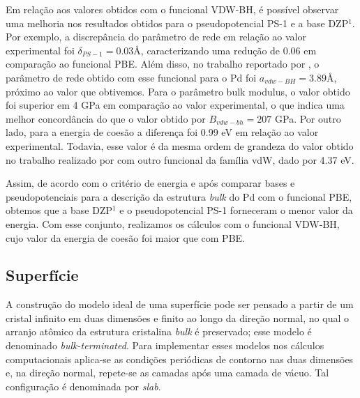 
Em relação aos valores obtidos com o funcional VDW-BH, é possível observar uma melhoria nos resultados obtidos para o pseudopotencial PS-1 e a base DZP$ ^1 $. Por exemplo, a discrepância do parâmetro de rede em relação ao valor experimental foi $ \delta_{PS-1}=0.03 \si{\angstrom}$, caracterizando uma redução de 0.06 em comparação ao funcional PBE. Além disso, no trabalho reportado por \citeauthor{vdw-bh}, o parâmetro de rede obtido com esse funcional para o Pd foi $ a_{vdw-BH}=3.89\si{\angstrom} $, próximo ao valor que obtivemos. Para o parâmetro bulk modulus, o valor obtido foi superior em 4 GPa em comparação ao valor experimental, o que indica uma melhor concordância do que o valor obtido por \citeauthor{vdw-bh} $ B_{vdw-bh}=207 $ GPa.  Por outro lado, para a energia de coesão a diferença foi 0.99 eV em relação ao valor experimental. Todavia, esse valor é da mesma ordem de grandeza do valor obtido no trabalho realizado por \citeauthor{vdw-article} com outro funcional da família vdW, dado por 4.37 eV.

Assim, de acordo com o critério de energia e após comparar bases e pseudopotenciais para a descrição da estrutura \textit{bulk} do Pd com o funcional PBE, obtemos que a base DZP$^1$ e o pseudopotencial PS-1 forneceram o menor valor da energia. Com esse conjunto, realizamos os cálculos com o funcional VDW-BH, cujo valor da energia de coesão foi maior que com PBE.


\subsection{Superfície}
A construção do modelo ideal de uma superfície pode ser pensado a partir de um cristal infinito em duas dimensões e finito ao longo da direção normal, no qual o arranjo atômico da estrutura cristalina \textit{bulk} é preservado; esse modelo é denominado \textit{bulk-terminated}. Para implementar esses modelos nos cálculos computacionais aplica-se as condições periódicas de contorno nas duas dimensões e, na direção normal, repete-se as camadas após uma camada de vácuo. Tal configuração é denominada por  \textit{slab}. 


